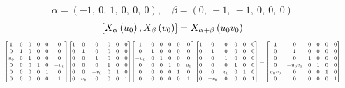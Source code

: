 \documentclass[11pt]{article}
\theoremstyle{definition}
\begin{document}
\[
\alpha = \left( -1, \  0, \  1, \  0, \  0, \  0\right), \quad \beta = \left( 0, \  -1, \  -1, \  0, \  0, \  0\right)
\]
\[
\scaletoalign{\textwidth}{\left[ X_{\alpha}\left(u_{0}\right), X_{\beta}\left(v_{0}\right) \right] = X_{\alpha + \beta}\left(u_{0} v_{0}\right)}
\]
\[
\scaletoalign{\textwidth}{{\left[\begin{matrix}1 & 0 & 0 & 0 & 0 & 0\\0 & 1 & 0 & 0 & 0 & 0\\u_{0} & 0 & 1 & 0 & 0 & 0\\0 & 0 & 0 & 1 & 0 & - u_{0}\\0 & 0 & 0 & 0 & 1 & 0\\0 & 0 & 0 & 0 & 0 & 1\end{matrix}\right]} {\left[\begin{matrix}1 & 0 & 0 & 0 & 0 & 0\\0 & 1 & 0 & 0 & 0 & 0\\0 & 0 & 1 & 0 & 0 & 0\\0 & 0 & 0 & 1 & 0 & 0\\0 & 0 & - v_{0} & 0 & 1 & 0\\0 & v_{0} & 0 & 0 & 0 & 1\end{matrix}\right]} {\left[\begin{matrix}1 & 0 & 0 & 0 & 0 & 0\\0 & 1 & 0 & 0 & 0 & 0\\- u_{0} & 0 & 1 & 0 & 0 & 0\\0 & 0 & 0 & 1 & 0 & u_{0}\\0 & 0 & 0 & 0 & 1 & 0\\0 & 0 & 0 & 0 & 0 & 1\end{matrix}\right]} {\left[\begin{matrix}1 & 0 & 0 & 0 & 0 & 0\\0 & 1 & 0 & 0 & 0 & 0\\0 & 0 & 1 & 0 & 0 & 0\\0 & 0 & 0 & 1 & 0 & 0\\0 & 0 & v_{0} & 0 & 1 & 0\\0 & - v_{0} & 0 & 0 & 0 & 1\end{matrix}\right]} = {\left[\begin{matrix}1 & 0 & 0 & 0 & 0 & 0\\0 & 1 & 0 & 0 & 0 & 0\\0 & 0 & 1 & 0 & 0 & 0\\0 & - u_{0} v_{0} & 0 & 1 & 0 & 0\\u_{0} v_{0} & 0 & 0 & 0 & 1 & 0\\0 & 0 & 0 & 0 & 0 & 1\end{matrix}\right]}}
\]
\end{document}
